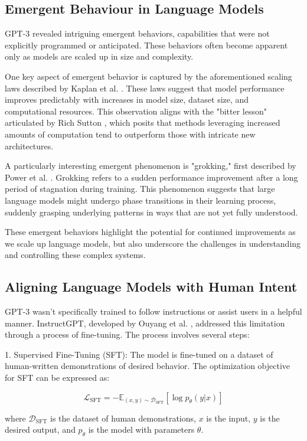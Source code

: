 \documentclass[a4paper, oneside]{discothesis}
\begin{document}
\subsection{Emergent Behaviour in Language Models}
GPT-3 revealed intriguing emergent behaviors, capabilities that were not explicitly programmed or anticipated. These behaviors often become apparent only as models are scaled up in size and complexity.

One key aspect of emergent behavior is captured by the aforementioned scaling laws described by Kaplan et al. \cite{kaplan2020scaling}. These laws suggest that model performance improves predictably with increases in model size, dataset size, and computational resources. This observation aligns with the "bitter lesson" articulated by Rich Sutton \cite{sutton2019bitter}, which posits that methods leveraging increased amounts of computation tend to outperform those with intricate new architectures.

A particularly interesting emergent phenomenon is "grokking," first described by Power et al. \cite{power2022grokking}. Grokking refers to a sudden performance improvement after a long period of stagnation during training. This phenomenon suggests that large language models might undergo phase transitions in their learning process, suddenly grasping underlying patterns in ways that are not yet fully understood.

These emergent behaviors highlight the potential for continued improvements as we scale up language models, but also underscore the challenges in understanding and controlling these complex systems.

\subsection{Aligning Language Models with Human Intent}
GPT-3 wasn't specifically trained to follow instructions or assist users in a helpful manner. InstructGPT, developed by Ouyang et al. 
\cite{ouyang2022training}, addressed this limitation through a process of fine-tuning.
The process involves several steps:

1. Supervised Fine-Tuning (SFT): The model is fine-tuned on a dataset of human-written demonstrations of desired behavior. The optimization objective for SFT can be expressed as:

   \[\mathcal{L}_{\text{SFT}} = -\mathbb{E}_{(x,y)\sim \mathcal{D}_{\text{SFT}}}[\log p_\theta(y|x)]\]

   where $\mathcal{D}_{\text{SFT}}$ is the dataset of human demonstrations, $x$ is the input, $y$ is the desired output, and $p_\theta$ is the model with parameters $\theta$.
\end{document}
